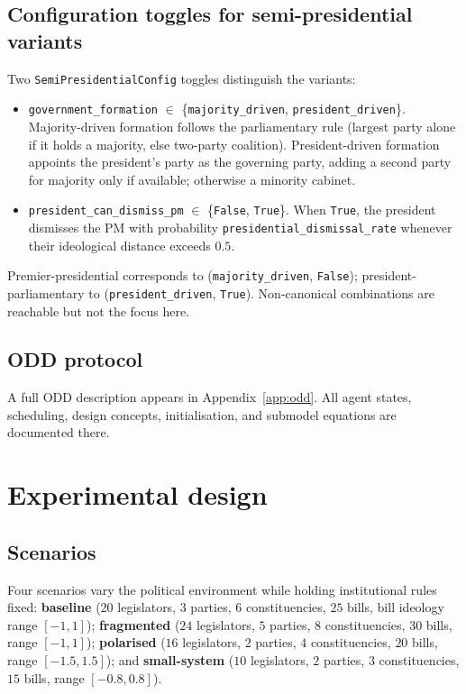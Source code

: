 \documentclass[11pt]{article}
\begin{document}
\subsection{Configuration toggles for semi-presidential variants}
Two \texttt{SemiPresidentialConfig} toggles distinguish the variants:

\begin{itemize}
    \item \texttt{government\_formation} $\in$ \{\texttt{majority\_driven},
        \texttt{president\_driven}\}. Majority-driven formation follows the
        parliamentary rule (largest party alone if it holds a majority,
        else two-party coalition). President-driven formation appoints the
        president's party as the governing party, adding a second party for
        majority only if available; otherwise a minority cabinet.
    \item \texttt{president\_can\_dismiss\_pm} $\in$ \{\texttt{False},
        \texttt{True}\}. When \texttt{True}, the president dismisses the PM
        with probability \texttt{presidential\_dismissal\_rate} whenever
        their ideological distance exceeds $0.5$.
\end{itemize}

Premier-presidential corresponds to
(\texttt{majority\_driven}, \texttt{False}); president-parliamentary to
(\texttt{president\_driven}, \texttt{True}). Non-canonical combinations are
reachable but not the focus here.

\subsection{ODD protocol}
A full ODD description \citep{grimm2010, grimm2020} appears in
Appendix~\ref{app:odd}. All agent states, scheduling, design concepts,
initialisation, and submodel equations are documented there.

\section{Experimental design}
\label{sec:design}

\subsection{Scenarios}
Four scenarios vary the political environment while holding institutional
rules fixed:
\textbf{baseline} ($20$ legislators, $3$ parties, $6$ constituencies, $25$
bills, bill ideology range $[-1, 1]$);
\textbf{fragmented} ($24$ legislators, $5$ parties, $8$ constituencies, $30$
bills, range $[-1, 1]$);
\textbf{polarised} ($16$ legislators, $2$ parties, $4$ constituencies, $20$
bills, range $[-1.5, 1.5]$); and
\textbf{small-system} ($10$ legislators, $2$ parties, $3$ constituencies,
$15$ bills, range $[-0.8, 0.8]$).
\end{document}
